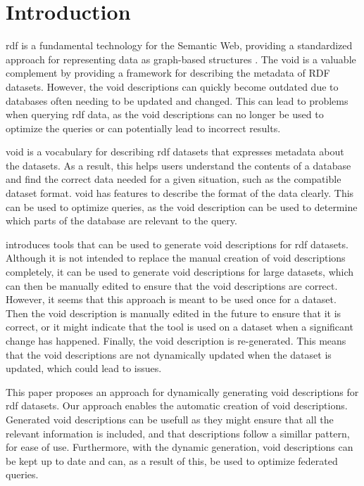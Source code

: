 \section{Introduction}\label{sec:introduction2}

\gls{rdf} is a fundamental technology for the Semantic Web, providing a standardized approach for representing data as graph-based structures \cite{the-web-of-data}. The \gls{void} is a valuable complement by providing a framework for describing the metadata of RDF datasets. However, the \gls{void} descriptions can quickly become outdated due to databases often needing to be updated and changed. This can lead to problems when querying \gls{rdf} data, as the \gls{void} descriptions can no longer be used to optimize the queries or can potentially lead to incorrect results.

\gls{void} is a vocabulary for describing \gls{rdf} datasets that expresses metadata about the datasets. As a result, this helps users understand the contents of a database and find the correct data needed for a given situation, such as the compatible dataset format. \gls{void} has features to describe the format of the data clearly. This can be used to optimize queries, as the \gls{void} description can be used to determine which parts of the database are relevant to the query. 

\cite{creating-void-descriptions} introduces tools that can be used to generate \gls{void} descriptions for \gls{rdf} datasets. Although it is not intended to replace the manual creation of \gls{void} descriptions completely, it can be used to generate \gls{void} descriptions for large datasets, which can then be manually edited to ensure that the \gls{void} descriptions are correct. However, it seems that this approach is meant to be used once for a dataset. Then the \gls{void} description is manually edited in the future to ensure that it is correct, or it might indicate that the tool is used on a dataset when a significant change has happened. Finally, the \gls{void} description is re-generated.  This means that the \gls{void} descriptions are not dynamically updated when the dataset is updated, which could lead to issues.

This paper proposes an approach for dynamically generating \gls{void} descriptions for \gls{rdf} datasets. Our approach enables the automatic creation of \gls{void} descriptions. Generated \gls{void} descriptions can be usefull as they might ensure that all the relevant information is included, and that descriptions follow a simillar pattern, for ease of use. Furthermore, with the dynamic generation, \gls{void} descriptions can be kept up to date and can, as a result of this, be used to optimize federated queries.



